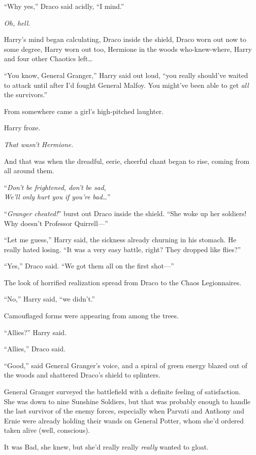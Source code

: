 “Why yes,” Draco said acidly, “I mind.”

\emph{Oh, hell.}

Harry’s mind began calculating, Draco inside the shield, Draco worn out now to some degree, Harry worn out too, Hermione in the woods who-knew-where, Harry and four other Chaotics left…

“You know, General Granger,” Harry said out loud, “you really should’ve waited to attack until after I’d fought General Malfoy. You might’ve been able to get \emph{all} the survivors.”

From somewhere came a girl’s high-pitched laughter.

Harry froze.

\emph{That wasn’t Hermione.}

And that was when the dreadful, eerie, cheerful chant began to rise, coming from all around them.

“\emph{Don’t be frightened, don’t be sad,\\
We’ll only hurt you if you’re bad…}”

“\emph{Granger cheated!}” burst out Draco inside the shield. “She woke up her soldiers! Why doesn’t Professor Quirrell—”

“Let me guess,” Harry said, the sickness already churning in his stomach. He really hated losing. “It was a very easy battle, right? They dropped like flies?”

“Yes,” Draco said. “We got them all on the first shot—”

The look of horrified realization spread from Draco to the Chaos Legionnaires.

“No,” Harry said, “we didn’t.”

Camouflaged forms were appearing from among the trees.

“Allies?” Harry said.

“Allies,” Draco said.

“Good,” said General Granger’s voice, and a spiral of green energy blazed out of the woods and shattered Draco’s shield to splinters.

\later

General Granger surveyed the battlefield with a definite feeling of satisfaction. She was down to nine Sunshine Soldiers, but that was probably enough to handle the last survivor of the enemy forces, especially when Parvati and Anthony and Ernie were already holding their wands on General Potter, whom she’d ordered taken alive (well, conscious).

It was Bad, she knew, but she’d really really \emph{really} wanted to gloat.

